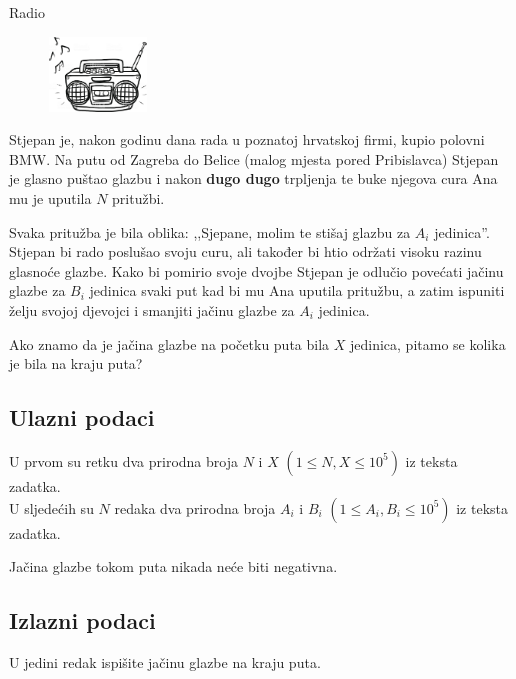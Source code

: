 \begin{statement}[
  problempoints=30,
  timelimit=1 sekunda,
  memorylimit=512 MiB,
]{Radio}

\setlength\intextsep{-0.1cm}
\begin{figure}
\centering
\includegraphics[width=0.23\textwidth]{img/radio.jpg}
\end{figure}

Stjepan je, nakon godinu dana rada u poznatoj hrvatskoj firmi, kupio polovni
BMW. Na putu od Zagreba do Belice (malog mjesta pored Pribislavca) Stjepan je
glasno puštao glazbu i nakon \textbf{dugo dugo} trpljenja te buke njegova
cura Ana mu je uputila $N$ pritužbi.

Svaka pritužba je bila oblika:
,,Sjepane, molim te stišaj glazbu za $A_i$ jedinica''.  Stjepan bi rado
poslušao svoju curu, ali također bi htio održati visoku razinu glasnoće
glazbe. Kako bi pomirio svoje dvojbe Stjepan je odlučio povećati jačinu
glazbe za $B_i$ jedinica svaki put kad bi mu Ana uputila pritužbu, a zatim
ispuniti želju svojoj djevojci i smanjiti jačinu glazbe za $A_i$ jedinica.

Ako znamo da je jačina glazbe na početku puta bila $X$ jedinica, pitamo se
kolika je bila na kraju puta?

\subsection*{Ulazni podaci}
U prvom su retku dva prirodna broja $N$ i $X$ $(1 \le N, X \le 10^5)$ iz teksta
zadatka. \\
U sljedećih su $N$ redaka dva prirodna broja $A_i$ i $B_i$ $(1 \le A_i, B_i \le 10^5)$
iz teksta zadatka.

Jačina glazbe tokom puta nikada neće biti negativna.

\subsection*{Izlazni podaci}
U jedini redak ispišite jačinu glazbe na kraju puta.


\end{statement}
